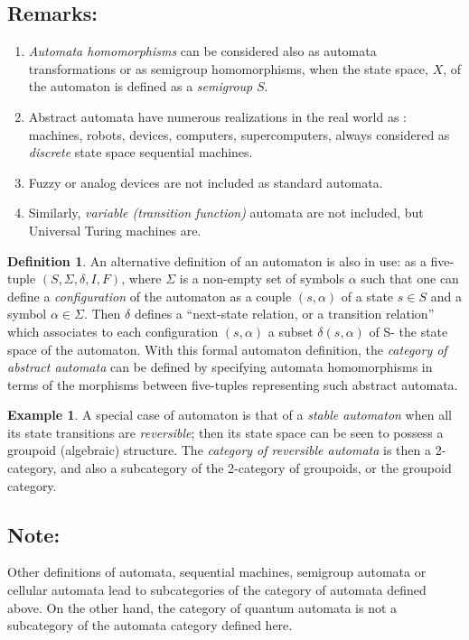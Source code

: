 \documentclass[12pt]{article}
\theoremstyle{plain}
\theoremstyle{definition}
\newtheorem{definition}{Definition}[section]
\newtheorem{example}{Example}[section]
\numberwithin{equation}{section}
\begin{document}
\subsection{Remarks:} 
\begin{enumerate}
\item \emph{Automata homomorphisms} can be considered also as automata transformations
or as semigroup homomorphisms, when the state space, $X$, of the automaton is defined
as a \emph{semigroup} $S$. 

\item Abstract automata have numerous realizations in the real world as : machines, robots, devices,
computers, supercomputers, always considered as \emph{discrete} state space sequential machines.
\item Fuzzy or analog devices are not included as standard automata.
\item Similarly, \emph{variable (transition function)} automata are not included, but Universal Turing machines are.
\end{enumerate}

\begin{definition} An alternative definition of an automaton is also in use:
as a five-tuple $(S, \Sigma, \delta, I, F)$, where $\Sigma$ is a non-empty set of symbols
$\alpha$ such that one can define a {\em configuration} of the automaton as a couple
$(s,\alpha)$ of a state $s \in S $ and a symbol $\alpha \in \Sigma $. Then $\delta$
defines a ``next-state relation, or a transition relation'' which associates to each configuration
$(s, \alpha)$ a subset $\delta (s,\alpha)$ of S- the state space of the automaton.
With this formal automaton definition, the \emph{category of abstract automata} can be defined by specifying automata homomorphisms in terms of the morphisms between five-tuples representing such abstract automata.
\end{definition}


\begin{example} A special case of automaton is that of a {\em stable automaton} when all its state transitions are {\em reversible}; then its state space can be seen to possess a groupoid (algebraic) structure. The {\em category of reversible automata} is then a 2-category, and also a subcategory of the 2-category of groupoids, or the groupoid category.  
\end{example}

\subsection{Note:}
Other definitions of automata, sequential machines, semigroup automata or cellular automata lead to subcategories of the category of automata defined above. On the other hand, the category of quantum automata is not a subcategory of the automata category defined here.

\end{document}
